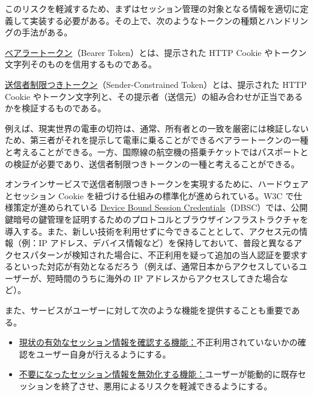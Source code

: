 \documentclass[uplatex]{jsarticle}
\def\label#1{}%
\begin{document}
このリスクを軽減するため、まずはセッション管理の対象となる情報を適切に定義して実装する必要がある。その上で、次のようなトークンの種類とハンドリングの手法がある。

\begin{dfn}[ベアラートークン]\label{dfn:ch2b-bearer-token}
\underline{ベアラートークン}（Bearer Token）とは、提示された HTTP Cookie やトークン文字列そのものを信用するものである。
\end{dfn}

\begin{dfn}[送信者制限つきトークン]\label{dfn:ch2b-sender-constrained-token}
\underline{送信者制限つきトークン}（Sender-Constrained Token）とは、提示された HTTP Cookie やトークン文字列と、その提示者（送信元）の組み合わせが正当であるかを検証するものである。
\end{dfn}

\begin{exa}[電車の切符と国際線の搭乗チケット]\label{exa:ch2b-ticket-boarding-pass}
例えば、現実世界の電車の切符は、通常、所有者との一致を厳密には検証しないため、第三者がそれを提示して電車に乗ることができるベアラートークンの一種と考えることができる。一方、国際線の航空機の搭乗チケットではパスポートとの検証が必要であり、送信者制限つきトークンの一種と考えることができる。
\end{exa}

オンラインサービスで送信者制限つきトークンを実現するために、ハードウェアとセッション Cookie を紐づける仕組みの標準化が進められている。W3C で仕様策定が進められている \underline{Device Bound Session Credentials}（DBSC）では、公開鍵暗号の鍵管理を証明するためのプロトコルとブラウザインフラストラクチャを導入する。また、新しい技術を利用せずに今できることとして、アクセス元の情報（例：IP アドレス、デバイス情報など）を保持しておいて、普段と異なるアクセスパターンが検知された場合に、不正利用を疑って追加の当人認証を要求するといった対応が有効となるだろう（例えば、通常日本からアクセスしているユーザーが、短時間のうちに海外の IP アドレスからアクセスしてきた場合など）。

また、サービスがユーザーに対して次のような機能を提供することも重要である。
\begin{itemize}
\item \underline{現状の有効なセッション情報を確認する機能：}不正利用されていないかの確認をユーザー自身が行えるようにする。
\item \underline{不要になったセッション情報を無効化する機能：}ユーザーが能動的に既存セッションを終了させ、悪用によるリスクを軽減できるようにする。
\end{itemize}
\end{document}
